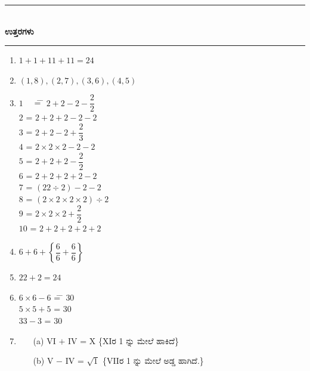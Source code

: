 \smallskip

\begin{center}
\rule{5cm}{1pt}\\[2pt]
{\Large\bfseries ಉತ್ತರಗಳು}\\[-0.1cm]
\rule{5cm}{1pt}
\end{center}


\begin{enumerate}
\itemsep=5pt
\item $1 + 1 + 11 + 11 = 24$

\smallskip
\item $(1, 8), (2, 7), (3, 6), (4, 5)$

\smallskip
\item 
\begin{tabbing}
$1$ ~~\= = \= $2 + 2 - 2 - \dfrac{2}{2}$\\[0.2cm]
$2$ \> = \> $2 + 2 + 2 - 2 - 2$\\[0.2cm]
$3$\> = \> $2 + 2 - 2 + \dfrac{2}{3}$\\[0.2cm]
$4$ \> = \> $2 \times 2 \times 2 - 2 - 2$\\[0.2cm]
$5$ \> = \> $2 + 2 + 2 - \dfrac{2}{2}$\\[0.2cm]
$6$ \> = \> $2 + 2 + 2 + 2 - 2$\\[0.2cm]
$7$ \> = \> $(22 \div 2) - 2 - 2$\\[0.2cm]
$8$ \> = \> $(2 \times 2 \times 2 \times 2) \div 2$\\[0.2cm]
$9$ \> = \> $2 \times 2 \times 2 + \dfrac{2}{2}$\\[0.2cm]
$10$ \> = \> $2 + 2 + 2 + 2 + 2$
\end{tabbing}

\smallskip
\item $6 + 6 +\left\{\dfrac{6}{6} + \dfrac{6}{6}\right\}$

\smallskip
\item $22 + 2 = 24$

\item 
\begin{tabbing}
$6 \times 6 - 6$ \= = \= $30$\\
$5 \times 5 + 5$ \> = \> $30$\\
$33 - 3$ \> = \> $30$
\end{tabbing}

\item 
\begin{itemize}
\item[(a)] VI $+$ IV = X \{XIರ 1 ನ್ನು ಮೇಲೆ ಹಾಕಿದೆ\}
\item[(b)] V $-$ IV = $\sqrt{1}$ \{VIIರ 1 ನ್ನು ಮೇಲೆ ಅಡ್ಡ ಹಾಗಿದೆ.\}
\end{itemize}


\end{enumerate}
